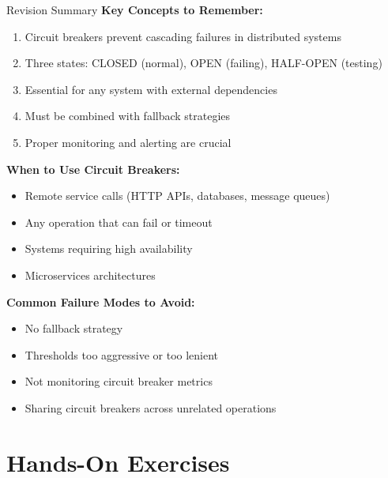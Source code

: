 \documentclass[12pt,a4paper]{article}
\begin{document}
\begin{interactivebox}{Revision Summary}
\textbf{Key Concepts to Remember:}
\begin{enumerate}
    \item Circuit breakers prevent cascading failures in distributed systems
    \item Three states: CLOSED (normal), OPEN (failing), HALF-OPEN (testing)
    \item Essential for any system with external dependencies
    \item Must be combined with fallback strategies
    \item Proper monitoring and alerting are crucial
\end{enumerate}

\textbf{When to Use Circuit Breakers:}
\begin{itemize}
    \item Remote service calls (HTTP APIs, databases, message queues)
    \item Any operation that can fail or timeout
    \item Systems requiring high availability
    \item Microservices architectures
\end{itemize}

\textbf{Common Failure Modes to Avoid:}
\begin{itemize}
    \item No fallback strategy
    \item Thresholds too aggressive or too lenient
    \item Not monitoring circuit breaker metrics
    \item Sharing circuit breakers across unrelated operations
\end{itemize}
\end{interactivebox}

\section{Hands-On Exercises}
\end{document}
